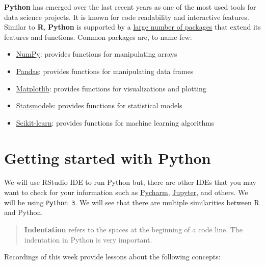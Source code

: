 \documentclass[
  letterpaper,
  DIV=11,
  numbers=noendperiod]{scrreprt}
\providecommand{\tightlist}{%
  \setlength{\itemsep}{0pt}\setlength{\parskip}{0pt}}\usepackage{longtable,booktabs,array}
\begin{document}

\textbf{Python} has emerged over the last recent years as one of the
most used tools for data science projects. It is known for code
readability and interactive features. Similar to \textbf{R},
\textbf{Python} is supported by a \href{https://pypi.org/}{large number
of packages} that extend its features and functions. Common packages
are, to name few:

\begin{itemize}
\tightlist
\item
  \href{https://numpy.org/doc/stable/}{NumPy}: provides functions for
  manipulating arrays
\item
  \href{https://pandas.pydata.org/docs/}{Pandas}: provides functions for
  manipulating data frames
\item
  \href{https://matplotlib.org/stable/tutorials/index.html}{Matplotlib}:
  provides functions for visualizations and plotting
\item
  \href{https://www.statsmodels.org/stable/gettingstarted.html}{Statsmodels}:
  provides functions for statistical models
\item
  \href{https://scikit-learn.org/stable/}{Scikit-learn}: provides
  functions for machine learning algorithms
\end{itemize}

\hypertarget{getting-started-with-python}{%
\section*{Getting started with
Python}\label{getting-started-with-python}}


We will use RStudio IDE to run Python but, there are other IDEs that you
may want to check for your information such as
\href{https://www.jetbrains.com/pycharm/}{Pycharm},
\href{https://jupyter.org/}{Jupyter}, and others. We will be using
\texttt{Python\ 3}. We will see that there are multiple similarities
between R and Python.

\begin{quote}
\textbf{Indentation} refers to the spaces at the beginning of a code
line. The indentation in Python is very important.
\end{quote}

Recordings of this week provide lessons about the following concepts:
\end{document}

